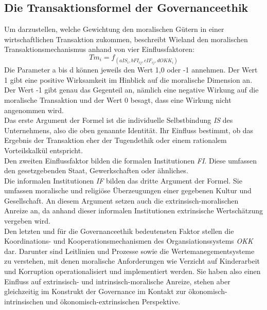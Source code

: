 \documentclass[12pt]{article}
\begin{document}
\subsection{Die Transaktionsformel der Governanceethik}
Um darzustellen, welche Gewichtung den moralischen Gütern in einer wirtschaftlichen Transaktion zukommen, beschreibt Wieland den moralischen Transaktionsmechanismus anhand von vier Einflussfaktoren:
\[Tm_{i}=f_{(aIS_i, bFI_{ij}, cIF_{ij}, dOKK_i)}\]
Die Parameter a bis d können jeweils den Wert 1,0 oder -1 annehmen. Der Wert 1 gibt eine positive Wirksamkeit im Hinblick auf die moralische Dimension an. Der Wert -1 gibt genau das Gegenteil an, nämlich eine negative Wirkung auf die moralische Transaktion und der Wert 0 besagt, dass eine Wirkung nicht angenommen wird.\\
Das erste Argument der Formel ist die individuelle Selbstbindung \textit{IS} des Unternehmens, also die oben genannte Identität. Ihr Einfluss bestimmt, ob das Ergebnis der Transaktion eher der Tugendethik oder einem rationalem Vorteilskalkül entspricht.\\
Den zweiten Einflussfaktor bilden die formalen Institutionen \textit{FI}. Diese umfassen den gesetzgebenden Staat, Gewerkschaften oder ähnliches.\\
Die informalen Institutionen \textit{IF} bilden das dritte Argument der Formel. Sie umfassen moralische und religiöse Überzeugungen einer gegebenen Kultur und Gesellschaft. An diesem Argument setzen auch die extrinsisch-moralischen Anreize an, da anhand dieser informalen Institutionen extrinsische Wertschätzung vergeben wird.\\
Den letzten und für die Governanceethik bedeutensten Faktor stellen die Koordinations- und Kooperationsmechanismen des Organsiationssystems \textit{OKK} dar. Darunter sind Leitlinien und Prozesse sowie die Wertemanegementsysteme zu verstehen, mit denen moralische Anforderungen wie Verzicht auf Kinderarbeit und Korruption operationalisiert und implementiert werden. Sie haben also einen Einfluss auf extrinsisch- und intrinsisch-moralische Anreize, stehen aber gleichzeitig im Konstrukt der Governance im Kontakt zur ökonomisch-intrinsischen und ökonomisch-extrinsischen Perspektive.
\end{document}
